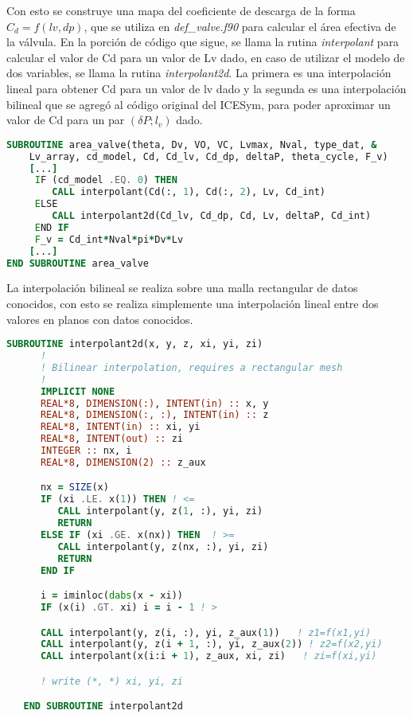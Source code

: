 Con esto se construye una mapa del coeficiente de descarga de la forma $C_d =
f(lv, dp)$, que se utiliza en \emph{def\_valve.f90} para calcular el área
efectiva de la válvula.
%
En la porción de código que sigue, se llama la rutina \emph{interpolant} para
calcular el valor de Cd para un valor de Lv dado, en caso de utilizar el modelo
de dos variables, se llama la rutina \emph{interpolant2d}.
%
La primera es una interpolación lineal para obtener Cd para un valor de lv dado
y la segunda es una interpolación bilineal que se agregó al código original del
ICESym, para poder aproximar un valor de Cd para un par $(\delta P; l_v)$ dado.

\begin{lstlisting}[language=fortran]
SUBROUTINE area_valve(theta, Dv, VO, VC, Lvmax, Nval, type_dat, &
    Lv_array, cd_model, Cd, Cd_lv, Cd_dp, deltaP, theta_cycle, F_v)
    [...]
     IF (cd_model .EQ. 0) THEN
        CALL interpolant(Cd(:, 1), Cd(:, 2), Lv, Cd_int)
     ELSE
        CALL interpolant2d(Cd_lv, Cd_dp, Cd, Lv, deltaP, Cd_int)
     END IF
     F_v = Cd_int*Nval*pi*Dv*Lv
    [...]
END SUBROUTINE area_valve
\end{lstlisting}

La interpolación bilineal se realiza sobre una malla rectangular de datos
conocidos, con esto se realiza simplemente una interpolación lineal entre dos
valores en planos con datos conocidos.

\begin{lstlisting}[language=fortran]
   SUBROUTINE interpolant2d(x, y, z, xi, yi, zi)
      !
      ! Bilinear interpolation, requires a rectangular mesh
      !
      IMPLICIT NONE
      REAL*8, DIMENSION(:), INTENT(in) :: x, y
      REAL*8, DIMENSION(:, :), INTENT(in) :: z
      REAL*8, INTENT(in) :: xi, yi
      REAL*8, INTENT(out) :: zi
      INTEGER :: nx, i
      REAL*8, DIMENSION(2) :: z_aux

      nx = SIZE(x)
      IF (xi .LE. x(1)) THEN ! <=
         CALL interpolant(y, z(1, :), yi, zi)
         RETURN
      ELSE IF (xi .GE. x(nx)) THEN  ! >=
         CALL interpolant(y, z(nx, :), yi, zi)
         RETURN
      END IF

      i = iminloc(dabs(x - xi))
      IF (x(i) .GT. xi) i = i - 1 ! >

      CALL interpolant(y, z(i, :), yi, z_aux(1))   ! z1=f(x1,yi)
      CALL interpolant(y, z(i + 1, :), yi, z_aux(2)) ! z2=f(x2,yi)
      CALL interpolant(x(i:i + 1), z_aux, xi, zi)   ! zi=f(xi,yi)

      ! write (*, *) xi, yi, zi

   END SUBROUTINE interpolant2d
\end{lstlisting}


